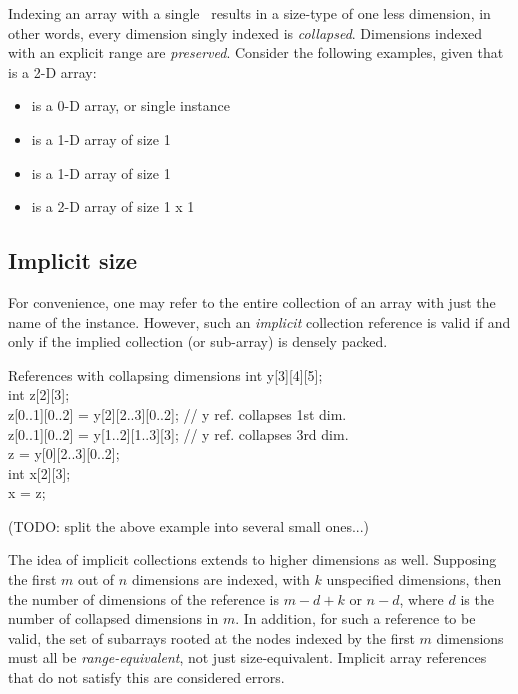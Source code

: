 Indexing an array with a single \pint\ results in a size-type of one less
dimension, in other words, every dimension singly indexed is \emph{collapsed}.  
Dimensions indexed with an explicit range are \emph{preserved}.  
Consider the following examples, given that  is a 2-D array:
\begin{itemize}
\item {} is a 0-D array, or single instance
\item {} is a 1-D array of size 1
\item {} is a 1-D array of size 1
\item {} is a 2-D array of size 1 x 1
\end{itemize}

\subsection{Implicit size}
\label{sec:arrays:references:implicit}

For convenience, one may refer to the entire collection
of an array with just the name of the instance.  
However, such an \emph{implicit} collection reference is valid
if and only if the implied collection (or sub-array) is densely packed.

\begin{example}{References with collapsing dimensions}
int y[3][4][5];\\
int z[2][3];\\
z[0..1][0..2] = y[2][2..3][0..2];  // y ref. collapses 1st dim.\\
z[0..1][0..2] = y[1..2][1..3][3];  // y ref. collapses 3rd dim.\\
z = y[0][2..3][0..2];\\
int x[2][3];\\
x = z;
\end{example}

(TODO: split the above example into several small ones...)

The idea of implicit collections extends to higher dimensions as well.  
Supposing the first $m$ out of $n$ dimensions are indexed, 
with $k$ unspecified dimensions, then the number of dimensions of the 
reference is $m-d+k$ or $n-d$,
where $d$ is the number of collapsed dimensions in $m$.  
In addition, for such a reference to be valid, 
the set of subarrays rooted at the nodes indexed by the 
first $m$ dimensions must all be \emph{range-equivalent}, 
not just size-equivalent.  
Implicit array references that do not satisfy this are considered errors.  

